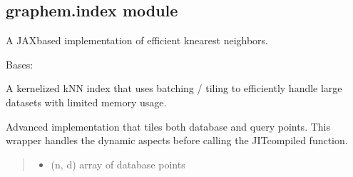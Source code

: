 \documentclass[letterpaper,10pt,english]{sphinxmanual}
\begin{document}
\subsection{graphem.index module}
\label{\detokenize{graphem:module-graphem.index}}\label{\detokenize{graphem:graphem-index-module}}
\sphinxAtStartPar
A JAX\sphinxhyphen{}based implementation of efficient k\sphinxhyphen{}nearest neighbors.

\begin{fulllineitems}
\label{\detokenize{graphem:graphem.index.HPIndex}}
\pysigstartsignatures
{}
\pysigstopsignatures
\sphinxAtStartPar
Bases: 

\sphinxAtStartPar
A kernelized kNN index that uses batching / tiling to efficiently handle
large datasets with limited memory usage.

\begin{fulllineitems}
\label{\detokenize{graphem:graphem.index.HPIndex.__init__}}
\pysigstartsignatures
{}
\pysigstopsignatures
\end{fulllineitems}


\begin{fulllineitems}
\label{\detokenize{graphem:graphem.index.HPIndex.knn_tiled}}
\pysigstartsignatures
{}
\pysigstopsignatures
\sphinxAtStartPar
Advanced implementation that tiles both database and query points.
This wrapper handles the dynamic aspects before calling the JIT\sphinxhyphen{}compiled
function.
\begin{quote}\begin{description}
\begin{itemize}
\item {} 
\sphinxAtStartPar
{} \textendash{} (n, d) array of database points


\end{itemize}
\end{description}
\end{quote}
\end{fulllineitems}
\end{fulllineitems}
\end{document}
